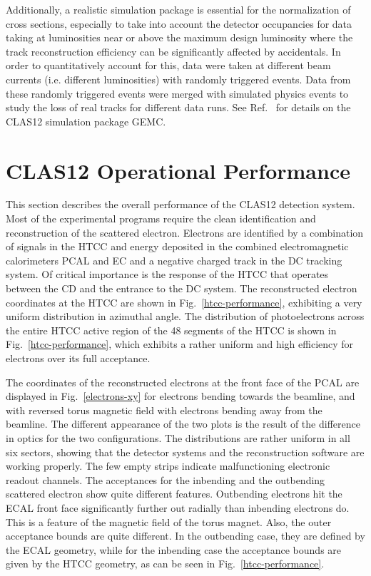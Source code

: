 \documentclass[final,3p,twocolumn]{elsarticle}
\begin{document}
Additionally, a realistic simulation package is essential for the normalization of cross sections, especially to take
into account the detector occupancies for data taking at luminosities near or above the maximum design luminosity
where the track reconstruction efficiency can be significantly affected by accidentals. In order to quantitatively
account for this, data were taken at different beam currents (i.e. different luminosities) with randomly triggered
events. Data from these randomly triggered events were merged with simulated physics events to study the loss
of real tracks for different data runs. See Ref.~\cite{GEMC} for details on the CLAS12 simulation package GEMC.



\section{CLAS12 Operational Performance}

This section describes the overall performance of the CLAS12 detection system. Most of the experimental
programs require the clean identification and reconstruction of the scattered electron. Electrons are identified
by a combination of signals in the HTCC and energy deposited in the combined electromagnetic calorimeters PCAL
and EC and a negative charged track in the DC tracking system. Of critical importance is the response of the HTCC
that operates between the CD and the entrance to the DC system. The reconstructed electron coordinates at the
HTCC are shown in Fig.~\ref{htcc-performance}, exhibiting a very uniform distribution in azimuthal angle. The
distribution of photoelectrons across the entire HTCC active region of the 48 segments of the HTCC is shown
in Fig.~\ref{htcc-performance}, which exhibits a rather uniform and high efficiency for electrons over its full acceptance.

The coordinates of the reconstructed electrons at the front face of the PCAL are displayed in
Fig.~\ref{electrons-xy} for electrons bending towards the beamline, and with
reversed torus magnetic field with electrons bending away from the beamline. The different appearance of the two
plots is the result of the difference in optics for the two configurations. The distributions are rather uniform in all
six sectors, showing that the detector systems and the reconstruction software are working properly. The few
empty strips indicate malfunctioning electronic readout channels. The acceptances for the inbending and the
outbending scattered electron show quite different features. Outbending electrons hit the ECAL front face
significantly further out radially than inbending electrons do. This is a feature of the magnetic field of the torus
magnet.  Also, the outer acceptance bounds are quite different. In the outbending case, they are defined by the
ECAL geometry, while for the inbending case the acceptance bounds are given by the HTCC geometry, as can be
seen in Fig.~\ref{htcc-performance}.      
\end{document}
